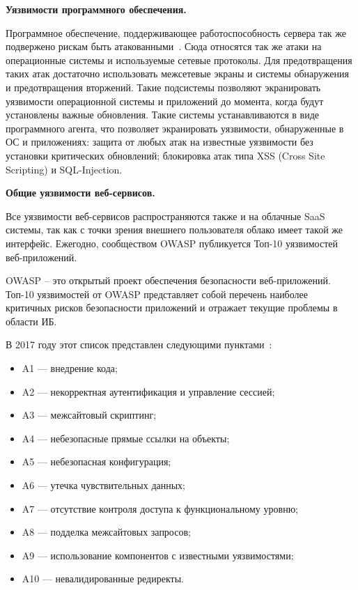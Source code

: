 \textbf{Уязвимости программного обеспечения.}

Программное обеспечение, поддерживающее работоспособность сервера так же подвержено рискам быть атакованными~\cite{volkov2015analize}. Сюда относятся так же атаки на операционные системы и используемые сетевые протоколы. Для предотвращения таких атак достаточно использовать межсетевые экраны и системы обнаружения и предотвращения вторжений. Такие подсистемы позволяют экранировать уязвимости операционной системы и приложений до момента, когда будут установлены важные обновления. Такие системы устанавливаются в виде программного агента, что позволяет экранировать уязвимости, обнаруженные в ОС и приложениях: защита от любых атак на известные уязвимости без установки критических обновлений; блокировка атак типа XSS (Cross Site Scripting) и SQL-Injection.

\textbf{Общие уязвимости веб-сервисов.}

Все уязвимости веб-сервисов распространяются также и на облачные SaaS системы, так как с точки зрения внешнего пользователя облако имеет такой же интерфейс. Ежегодно, сообществом OWASP публикуется Топ-10 уязвимостей веб-приложений.

OWASP – это открытый проект обеспечения безопасности веб-приложений. Топ-10 уязвимостей от OWASP представляет собой перечень наиболее критичных рисков безопасности приложений и отражает текущие проблемы в области ИБ. 

В 2017 году этот список представлен следующими пунктами~\cite{OWASP}:

\begin{itemize}
	\item A1 --- внедрение кода;
	\item A2 --- некорректная аутентификация и управление сессией;
	\item A3 --- межсайтовый скриптинг;
	\item A4 --- небезопасные прямые ссылки на объекты;
	\item A5 --- небезопасная конфигурация;
	\item A6 --- утечка чувствительных данных;
	\item A7 --- отсутствие контроля доступа к функциональному уровню;
	\item A8 --- подделка межсайтовых запросов;
	\item A9 --- использование компонентов с известными уязвимостями;
	\item A10 --- невалидированные редиректы.
\end{itemize}

